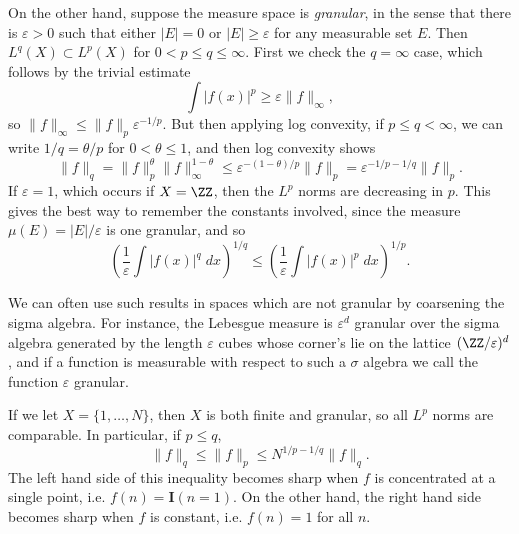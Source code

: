 \begin{example}
  On the other hand, suppose the measure space is {\it granular}, in the sense that there is $\varepsilon > 0$ such that either $|E| = 0$ or $|E| \geq \varepsilon$ for any measurable set $E$. Then $L^q(X) \subset L^p(X)$ for $0 < p \leq q \leq \infty$. First we check the $q = \infty$ case, which follows by the trivial estimate
  \[ \int |f(x)|^p \geq \varepsilon \| f \|_\infty, \]
  so $\| f \|_\infty \leq \| f \|_p \varepsilon^{-1/p}$. But then applying log convexity, if $p \leq q < \infty$, we can write $1/q = \theta/p$ for $0 < \theta \leq 1$, and then log convexity shows
  \[ \| f \|_q = \| f \|_p^\theta \| f \|_\infty^{1-\theta} \leq \varepsilon^{-(1 - \theta)/p} \| f \|_p = \varepsilon^{-1/p - 1/q} \| f \|_p. \]
  If $\varepsilon = 1$, which occurs if $X = \ZZ$, then the $L^p$ norms are decreasing in $p$. This gives the best way to remember the constants involved, since the measure $\mu(E) = |E|/\varepsilon$ is one granular, and so
  \[ \left( \frac{1}{\varepsilon} \int |f(x)|^q\; dx \right)^{1/q} \leq \left( \frac{1}{\varepsilon} \int |f(x)|^p\; dx \right)^{1/p}. \]
\end{example}



\begin{remark}
  We can often use such results in spaces which are not granular by coarsening the sigma algebra. For instance, the Lebesgue measure is $\varepsilon^d$ granular over the sigma algebra generated by the length $\varepsilon$ cubes whose corner's lie on the lattice $(\ZZ/\varepsilon)^d$, and if a function is measurable with respect to such a $\sigma$ algebra we call the function $\varepsilon$ granular.
\end{remark}

\begin{remark}
  If we let $X = \{ 1, \dots, N \}$, then $X$ is both finite and granular, so all $L^p$ norms are comparable. In particular, if $p \leq q$,
  \[ \| f \|_q \leq \| f \|_p \leq N^{1/p - 1/q} \| f \|_q. \]
  The left hand side of this inequality becomes sharp when $f$ is concentrated at a single point, i.e. $f(n) = \mathbf{I}(n = 1)$. On the other hand, the right hand side becomes sharp when $f$ is constant, i.e. $f(n) = 1$ for all $n$.
\end{remark}

